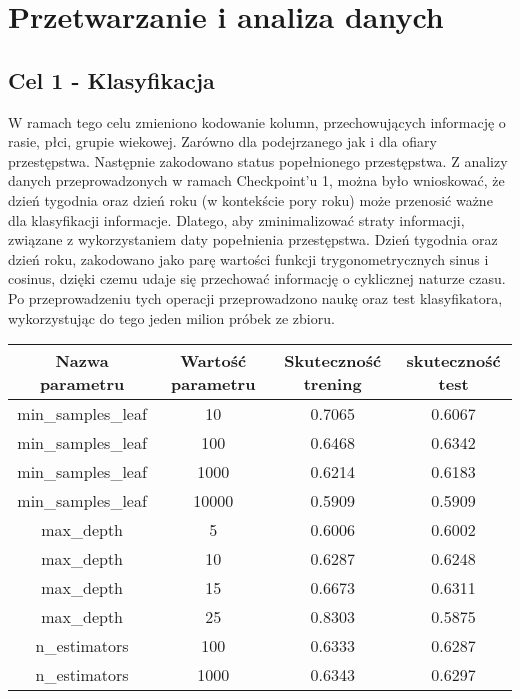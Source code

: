 \documentclass{classrep}
\begin{document}
    \section{Przetwarzanie i analiza danych} {

        \subsection{Cel 1 - Klasyfikacja} {
            W ramach tego celu zmieniono kodowanie kolumn, przechowujących informację o rasie, płci, grupie wiekowej. Zarówno dla podejrzanego jak i dla ofiary przestępstwa. Następnie zakodowano status popełnionego przestępstwa. Z analizy danych przeprowadzonych w ramach Checkpoint'u 1, można było wnioskować, że dzień tygodnia oraz dzień roku (w kontekście pory roku) może przenosić ważne dla klasyfikacji informacje. Dlatego, aby zminimalizować straty informacji, związane z wykorzystaniem daty popełnienia przestępstwa. Dzień tygodnia oraz dzień roku, zakodowano jako parę wartości funkcji trygonometrycznych sinus i cosinus, dzięki czemu udaje się przechować informację o cyklicznej naturze czasu.
            Po przeprowadzeniu tych operacji przeprowadzono naukę oraz test klasyfikatora, wykorzystując do tego jeden milion próbek ze zbioru. 
                        \FloatBarrier

            \begin{table}
    \centering
    \begin{tabular}{|c|c|c|c|}
        \hline
      Nazwa parametru & Wartość parametru & Skuteczność trening & skuteczność test \\ \hline
            min\_samples\_leaf & 10 & 0.7065 & 0.6067 \\ \hline
            min\_samples\_leaf & 100 & 0.6468 & 0.6342 \\ \hline
            min\_samples\_leaf & 1000 & 0.6214 & 0.6183 \\ \hline
            min\_samples\_leaf & 10000 & 0.5909 & 0.5909 \\ \hline
            max\_depth & 5 & 0.6006 & 0.6002 \\ \hline
            max\_depth & 10 & 0.6287 & 0.6248 \\ \hline
            max\_depth & 15 & 0.6673 & 0.6311 \\ \hline
            max\_depth & 25 & 0.8303 & 0.5875 \\ \hline
            n\_estimators & 100 & 0.6333 & 0.6287 \\ \hline
            n\_estimators & 1000 & 0.6343 & 0.6297 \\ \hline
            

\end{tabular}
\end{table}}}
\end{document}

